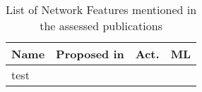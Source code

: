 \begin{table}[htbp]
    \caption{List of Network Features mentioned in the assessed publications}
    \label{tab:feat_Network}
    \centering
    \begin{tabular}{m{} m{} c c}
        \toprule
        \textbf{Name} & \textbf{Proposed in} & \textbf{Act.} & \textbf{ML} \\ 
        \midrule
        test
        \bottomrule
    \end{tabular}
\end{table}